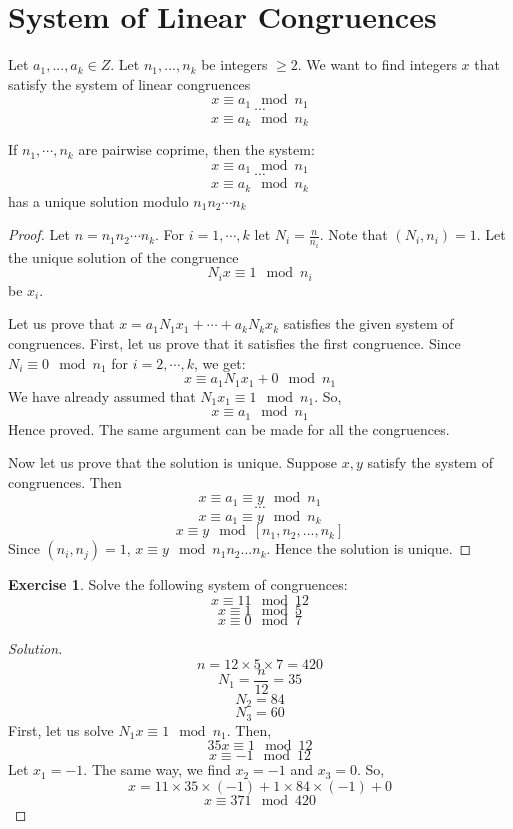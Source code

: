 \documentclass[12pt,letterpaper]{book}
\theoremstyle{definition}
\newtheorem*{exercise}{Exercise}
\newenvironment{solution}
  {\renewcommand\qedsymbol{$\blacksquare$}\begin{proof}[Solution]}
  {\end{proof}}
\begin{document}
\section{System of Linear Congruences}

Let $a_1,...,a_k \in Z$. Let $n_1,...,n_k$ be integers $\geq 2$. We want to find integers $x$ that satisfy the system of linear congruences
\[x \equiv a_1 \mod n_1\]
\[ \cdots \]
\[x \equiv a_k \mod n_k\]

\begin{theorem}
  If $n_1,\cdots, n_k$ are pairwise coprime, then the system:
  \[x \equiv a_1 \mod n_1\]
  \[ \cdots \]
  \[x \equiv a_k \mod n_k\]
  has a unique solution modulo $n_1n_2 \cdots n_k$
\end{theorem}
\begin{proof}
  Let $n = n_1n_2\cdots n_k$. For $i = 1,\cdots,k$ let $N_i = \frac{n}{n_i}$. Note that $(N_i,n_i) = 1$. Let the unique solution of the congruence
  \[N_i x \equiv 1 \mod n_i\]
  be $x_i$.

  Let us prove that $x = a_1N_1x_1 + \cdots + a_kN_k x_k$ satisfies the given system of congruences. First, let us prove that it satisfies the first congruence. Since $N_i \equiv 0 \mod n_1$ for $i = 2, \cdots, k$, we get:
  \[x \equiv a_1 N_1 x_1 + 0 \mod n_1\]
  We have already assumed that $N_1x_1 \equiv 1 \mod n_1$. So,
  \[x \equiv a_1 \mod n_1\]
  Hence proved. The same argument can be made for all the congruences.

  Now let us prove that the solution is unique. Suppose $x,y$ satisfy the system of congruences. Then
  \[x \equiv a_1 \equiv y \mod n_1\]
  \[\cdots\]
  \[x \equiv a_1 \equiv y \mod n_k\]
  \[x \equiv y \mod [n_1,n_2,...,n_k]\]
  Since $(n_i,n_j) = 1$, $x \equiv y \mod n_1n_2...n_k$. Hence the solution is unique.
\end{proof}

\begin{exercise}
  Solve the following system of congruences:
  \[x \equiv 11 \mod 12\]
  \[x \equiv 1 \mod 5\]
  \[x \equiv 0 \mod 7\]
\end{exercise}
\begin{solution}
  \[n = 12 \times 5 \times 7 = 420 \]
  \[N_1 = \frac{n}{12} = 35\]
  \[N_2 = 84\]
  \[N_3 = 60\]
  First, let us solve $N_1 x \equiv 1 \mod n_1$. Then,
  \[35x \equiv 1 \mod 12\]
  \[x \equiv -1 \mod 12\]
  Let $x_1 = -1$. The same way, we find $x_2 = -1$ and $x_3 = 0$. So,
  \[x = 11 \times 35 \times (-1) + 1 \times 84 \times (-1) + 0\]
  \[x \equiv 371 \mod 420\]
\end{solution}
\end{document}
